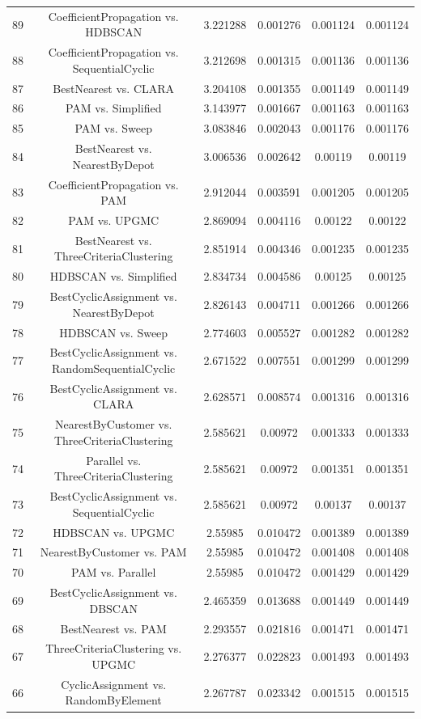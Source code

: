 \documentclass[a4paper,10pt]{article}
\begin{document}
\begin{landscape}
\begin{table}[!htp]
\begin{tabular}{cccccc}
89&CoefficientPropagation vs. HDBSCAN&3.221288&0.001276&0.001124&0.001124\\
88&CoefficientPropagation vs. SequentialCyclic&3.212698&0.001315&0.001136&0.001136\\
87&BestNearest vs. CLARA&3.204108&0.001355&0.001149&0.001149\\
86&PAM vs. Simplified&3.143977&0.001667&0.001163&0.001163\\
85&PAM vs. Sweep&3.083846&0.002043&0.001176&0.001176\\
84&BestNearest vs. NearestByDepot&3.006536&0.002642&0.00119&0.00119\\
83&CoefficientPropagation vs. PAM&2.912044&0.003591&0.001205&0.001205\\
82&PAM vs. UPGMC&2.869094&0.004116&0.00122&0.00122\\
81&BestNearest vs. ThreeCriteriaClustering&2.851914&0.004346&0.001235&0.001235\\
80&HDBSCAN vs. Simplified&2.834734&0.004586&0.00125&0.00125\\
79&BestCyclicAssignment vs. NearestByDepot&2.826143&0.004711&0.001266&0.001266\\
78&HDBSCAN vs. Sweep&2.774603&0.005527&0.001282&0.001282\\
77&BestCyclicAssignment vs. RandomSequentialCyclic&2.671522&0.007551&0.001299&0.001299\\
76&BestCyclicAssignment vs. CLARA&2.628571&0.008574&0.001316&0.001316\\
75&NearestByCustomer vs. ThreeCriteriaClustering&2.585621&0.00972&0.001333&0.001333\\
74&Parallel vs. ThreeCriteriaClustering&2.585621&0.00972&0.001351&0.001351\\
73&BestCyclicAssignment vs. SequentialCyclic&2.585621&0.00972&0.00137&0.00137\\
72&HDBSCAN vs. UPGMC&2.55985&0.010472&0.001389&0.001389\\
71&NearestByCustomer vs. PAM&2.55985&0.010472&0.001408&0.001408\\
70&PAM vs. Parallel&2.55985&0.010472&0.001429&0.001429\\
69&BestCyclicAssignment vs. DBSCAN&2.465359&0.013688&0.001449&0.001449\\
68&BestNearest vs. PAM&2.293557&0.021816&0.001471&0.001471\\
67&ThreeCriteriaClustering vs. UPGMC&2.276377&0.022823&0.001493&0.001493\\
66&CyclicAssignment vs. RandomByElement&2.267787&0.023342&0.001515&0.001515\\

\end{tabular}
\end{table}
\end{landscape}
\end{document}
